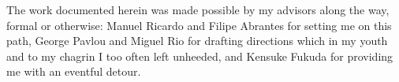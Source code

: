 \begin{acknowledgements}

The work documented herein was made possible by my advisors along the way, formal or otherwise: Manuel Ricardo and Filipe Abrantes for setting me on this path, George Pavlou and Miguel Rio for drafting directions which in my youth and to my chagrin I too often left unheeded, and Kensuke Fukuda for providing me with an eventful detour.



\end{acknowledgements}

%



